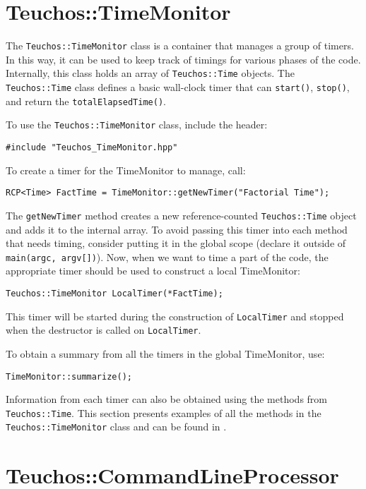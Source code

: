 
\section{Teuchos::TimeMonitor}
\label{sec:teuchos:TimeMonitor}

The \verb!Teuchos::TimeMonitor! class is a container that manages a
group of timers.  In this way, it can be used to keep track of timings
for various phases of the code.  Internally, this class holds an array 
of \verb!Teuchos::Time! objects.  The 
\verb!Teuchos::Time! class defines a basic wall-clock timer that can 
\verb!start()!, \verb!stop()!, and return the \verb!totalElapsedTime()!.

To use the \verb!Teuchos::TimeMonitor! class, include the header:
{\small 
\begin{verbatim}
#include "Teuchos_TimeMonitor.hpp"
\end{verbatim}}
To create a timer for the TimeMonitor to manage, call:
{\small 
\begin{verbatim}
RCP<Time> FactTime = TimeMonitor::getNewTimer("Factorial Time");
\end{verbatim}}
\noindent The {\tt getNewTimer} method creates a new reference-counted
{\tt Teuchos::Time} object and adds it to the internal array.  To avoid
passing this timer into each method that needs timing, consider putting it in the
global scope (declare it outside of {\tt main(argc, argv[])}).  Now, when 
we want to time a part of the code, the appropriate timer should be used to 
construct a local TimeMonitor:
{\small
\begin{verbatim}
Teuchos::TimeMonitor LocalTimer(*FactTime);
\end{verbatim}}
\noindent This timer will be started during the construction of {\tt LocalTimer}
and stopped when the destructor is called on {\tt LocalTimer}.

To obtain a summary from all the timers in the global TimeMonitor, use:
{\small
\begin{verbatim}
TimeMonitor::summarize();
\end{verbatim}}
\noindent Information from each timer can also be obtained using 
the methods from {\tt Teuchos::Time}.  
This section presents examples of all the 
methods in the {\tt Teuchos::TimeMonitor} class and can be found in
.  


\section{Teuchos::CommandLineProcessor}
\label{sec:teuchos:CLP}

